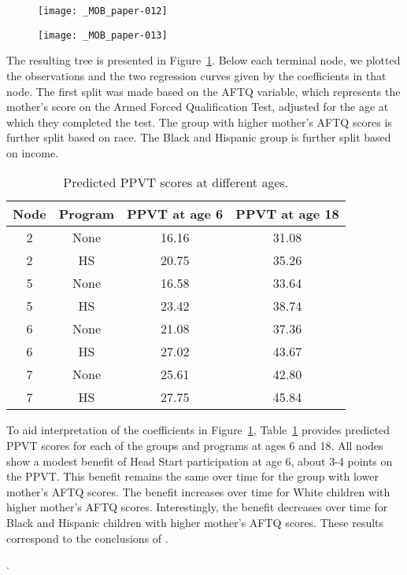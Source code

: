 \documentclass[doc,floatsintext,natbib]{apa7}
\begin{document}
\begin{figure}%
\caption{}
\texttt{[image: \_MOB\_paper-012]}

\vspace*{-3cm}

\texttt{[image: \_MOB\_paper-013]}
\label{fig:lmm_tree}
\end{figure}%

The resulting tree is presented in Figure~\ref{fig:lmm_tree}. Below each terminal node, we plotted the observations and the two regression curves given by the coefficients in that node. The first split was made based on the AFTQ variable, which represents the mother's score on the Armed Forced Qualification Test, adjusted for the age at which they completed the test. The group with higher mother's AFTQ scores is further split based on race. The Black and Hispanic group is further split based on income. 

\begin{table}

\caption{\label{tab:predictions}Predicted PPVT scores at different ages.}
\begin{tabular}[t]{cccc}
\toprule
Node & Program & PPVT at age 6 & PPVT at age 18\\
\midrule
2 & None & 16.16 & 31.08\\
2 & HS & 20.75 & 35.26\\
5 & None & 16.58 & 33.64\\
5 & HS & 23.42 & 38.74\\
6 & None & 21.08 & 37.36\\
6 & HS & 27.02 & 43.67\\
7 & None & 25.61 & 42.80\\
7 & HS & 27.75 & 45.84\\
\bottomrule
\end{tabular}
\end{table}
To aid interpretation of the coefficients in Figure~\ref{fig:lmm_tree}, Table~\ref{tab:predictions} provides predicted PPVT scores for each of the groups and programs at ages 6 and 18. All nodes show a modest benefit of Head Start participation at age 6, about 3-4 points on the PPVT. This benefit remains the same over time for the group with lower mother's AFTQ scores. The benefit increases over time for White children with higher mother's AFTQ scores. Interestingly, the benefit decreases over time for Black and Hispanic children with higher mother's AFTQ scores. These results correspond to the conclusions of \cite{Demi09}. 


.
\end{document}
